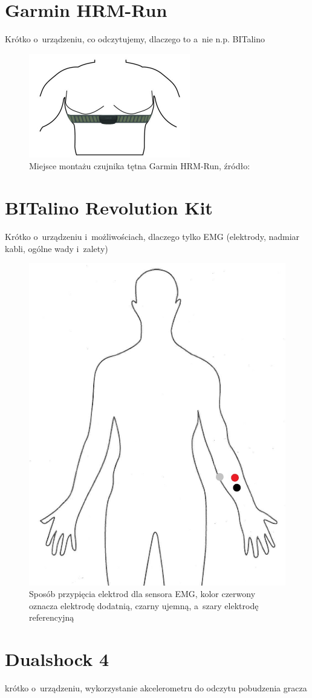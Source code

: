 \section{Garmin HRM-Run}
Krótko o~urządzeniu, co odczytujemy, dlaczego to a~nie n.p. BITalino
\begin{figure}
	\centering
	\includegraphics[width=0.5\linewidth]{images/garmin_hrm_placement.png}
	\caption{Miejsce montażu czujnika tętna Garmin HRM-Run, źródło:~\cite{garmin_manual}}
	\label{fig:garmin_placement}
\end{figure}

\section{BITalino Revolution Kit}
Krótko o~urządzeniu i~możliwościach, dlaczego tylko EMG (elektrody, nadmiar kabli, ogólne wady i~zalety)
\begin{figure}
	\centering
	\includegraphics[height=0.3\textheight]{images/bitalino_placement.jpg}
	\caption{Sposób przypięcia elektrod dla sensora EMG,  kolor czerwony oznacza elektrodę dodatnią, czarny ujemną, a~szary elektrodę referencyjną}
	\label{fig:bitalino_placement}
\end{figure}

\section{Dualshock 4}
krótko o~urządzeniu, wykorzystanie akcelerometru do odczytu pobudzenia gracza
